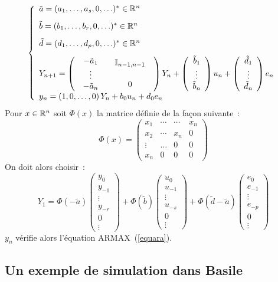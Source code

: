 \begin{equation}
	\left\{
	\begin{array}{l}
	\tilde{a}=  (a_{1},\ldots,a_{s},0,\ldots)^* \in {\Bbb R}^n \\[3mm]
	\tilde{b}=  (b_{1},\ldots,b_{r},0,\ldots)^* \in {\Bbb R}^n \\[3mm]
	\tilde{d}=  (d_{1},\ldots,d_{p},0,\ldots)^* \in {\Bbb R}^n \\[3mm]
	Y_{n+1}=
	\left( \begin{array}{cc} \begin{array}{c} -\tilde{a}_{1}\\ \vdots \\ -\tilde{a}_{n} \\ \end{array} &
		\begin{array}{c} {\Bbb I}_{n-1,n-1} \\[5mm]  0 \end{array}
	       \end{array} \right) Y_{n} 
	+ \left( \begin{array}{c} \tilde{b}_{1}\\ \vdots \\ \tilde{b}_{n} \\ \end{array} \right) u_{n} 
	+ \left( \begin{array}{c} \tilde{d}_{1}\\ \vdots \\ \tilde{d}_{n} \\ \end{array} \right) e_{n} \\[3mm]
	y_{n} = \left( 1,0,\ldots,0 \right) Y_{n} + b_{0} u_{n} + d_{0} e_{n}
	\end{array}\right.
\end{equation}
Pour $x\in {\Bbb R}^n$ soit $\Phi(x)$ la matrice d\'efinie de la fa\c{c}on suivante~:
\begin{equation}
	\Phi(x)= 
	\left( \begin{array}{cccc}
		x_{1} & \cdots & \cdots & x_{n} \\
		x_{2} & \cdots & x_{n} & 0 \\
		\vdots & \ldots & 0 & 0 \\
		x_{n} & 0 & 0 & 0 
	       \end{array} \right) 
\end{equation}
On doit alors choisir~:
\def\avectp#1#2{\left( \begin{array}{c} #1_{0}\\ #1_{-1} \\ 
		\vdots \\ #1_{-#2} \\ 0 \\ \vdots \end{array}\right) }
\begin{equation}
	Y_{1} = \Phi(-\tilde{a})\avectp{y}{r} + \Phi(\tilde{b})\avectp{u}{s} 
	+ \Phi(\tilde{d}-\tilde{a}) \avectp{e}{p}
\end{equation}
$y_{n}$ v\'erifie alors l'\'equation ARMAX~(\ref{equara}).

\subsection{Un exemple de simulation dans Basile}


